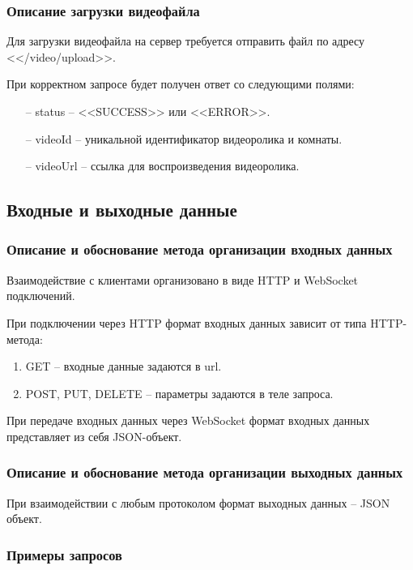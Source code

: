 \documentclass{../includes/TechDoc}
\begin{document}
    \subsubsection{Описание загрузки видеофайла}

    Для загрузки видеофайла на сервер требуется отправить файл по адресу <</video/upload>>.

    При корректном запросе будет получен ответ со следующими полями:
    \begin{itemize}
    	\item[--] status -- <<SUCCESS>> или <<ERROR>>.
    	\item[--] videoId -- уникальной идентификатор видеоролика и комнаты.
    	\item[--] videoUrl -- ссылка для воспроизведения видеоролика.
    \end{itemize}


    \subsection{Входные и выходные данные}

    \subsubsection{Описание и обоснование метода организации входных данных}

    Взаимодействие с клиентами организовано в виде HTTP и WebSocket подключений.

    При подключении через HTTP формат входных данных зависит от типа HTTP-метода:
    \begin{enumerate}
        \item GET -- входные данные задаются в url.
        \item POST, PUT, DELETE -- параметры задаются в теле запроса.
    \end{enumerate}

    При передаче входных данных через WebSocket формат входных данных представляет из себя JSON-объект.

    \subsubsection{Описание и обоснование метода организации выходных данных}

    При взаимодействии с любым протоколом формат выходных данных -- JSON объект.

    \subsubsection{Примеры запросов}
\end{document}
